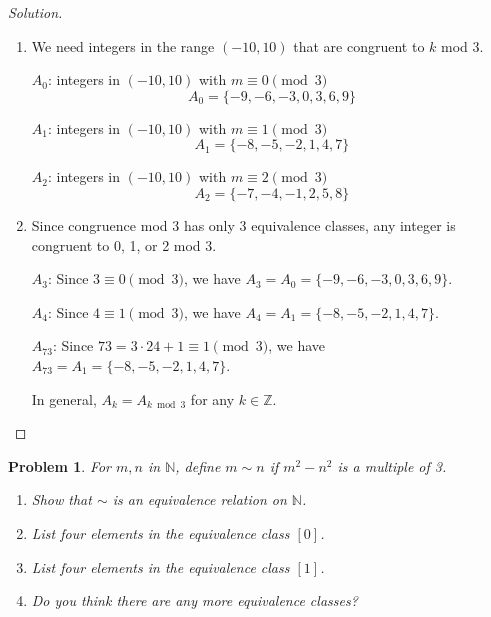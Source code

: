 \documentclass[12pt]{article}
\newtheorem{problem}{Problem}
\newcommand{\NN}{\ensuremath{\mathbb N}}
\newcommand{\ZZ}{\ensuremath{\mathbb Z}}
\begin{document}
\begin{proof}[Solution]
~
\begin{enumerate}[label=(\alph*)]
    \item We need integers in the range $(-10, 10)$ that are congruent to $k$ mod 3.
    
    $A_0$: integers in $(-10, 10)$ with $m \equiv 0 \pmod{3}$
    $$A_0 = \{-9, -6, -3, 0, 3, 6, 9\}$$
    
    $A_1$: integers in $(-10, 10)$ with $m \equiv 1 \pmod{3}$
    $$A_1 = \{-8, -5, -2, 1, 4, 7\}$$
    
    $A_2$: integers in $(-10, 10)$ with $m \equiv 2 \pmod{3}$
    $$A_2 = \{-7, -4, -1, 2, 5, 8\}$$
    
    \item Since congruence mod 3 has only 3 equivalence classes, any integer is congruent to 0, 1, or 2 mod 3.
    
    $A_3$: Since $3 \equiv 0 \pmod{3}$, we have $A_3 = A_0 = \{-9, -6, -3, 0, 3, 6, 9\}$.
    
    $A_4$: Since $4 \equiv 1 \pmod{3}$, we have $A_4 = A_1 = \{-8, -5, -2, 1, 4, 7\}$.
    
    $A_{73}$: Since $73 = 3 \cdot 24 + 1 \equiv 1 \pmod{3}$, we have $A_{73} = A_1 = \{-8, -5, -2, 1, 4, 7\}$.
    
    In general, $A_k = A_{k \bmod 3}$ for any $k \in \ZZ$.
\end{enumerate}
\end{proof}


\setcounter{problem}{11}
\begin{problem}
For $m, n$ in $\NN$, define $m \sim n$ if $m^2 - n^2$ is a multiple of 3.

\begin{enumerate}[label=(\alph*)]
    \item Show that $\sim$ is an equivalence relation on $\NN$.
    
    \item List four elements in the equivalence class $[0]$.
    
    \item List four elements in the equivalence class $[1]$.
    
    \item Do you think there are any more equivalence classes?
\end{enumerate}
\end{problem}
\end{document}
